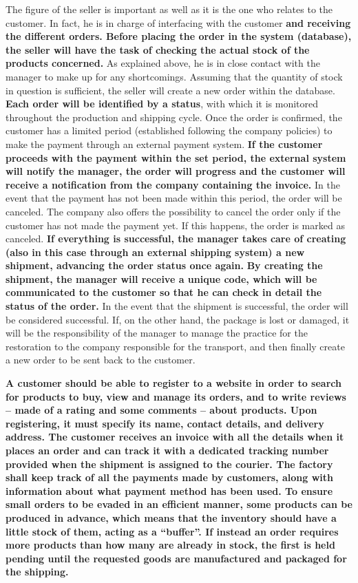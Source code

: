 The figure of the seller is important as well as it is the one who relates to the customer. In fact, he is in charge of interfacing with the customer \textbf{and receiving the different orders. Before placing the order in the system (database), the seller will have the task of checking the actual stock of the products concerned.} As explained above, he is in close contact with the manager to make up for any shortcomings. Assuming that the quantity of stock in question is sufficient, the seller will create a new order within the database. \textbf{Each order will be identified by a status}, with which it is monitored throughout the production and shipping cycle. Once the order is confirmed, the customer has a limited period (established following the company policies) to make the payment through an external payment system. \textbf{If the customer proceeds with the payment within the set period, the external system will notify the manager, the order will progress and the customer will receive a notification from the company containing the invoice.} In the event that the payment has not been made within this period, the order will be canceled. The company also offers the possibility to cancel the order only if the customer has not made the payment yet. If this happens, the order is marked as canceled. \textbf{If everything is successful, the manager takes care of creating (also in this case through an external shipping system) a new shipment, advancing the order status once again.} \textbf{By creating the shipment, the manager will receive a unique code, which will be communicated to the customer so that he can check in detail the status of the order.} In the event that the shipment is successful, the order will be considered successful. If, on the other hand, the package is lost or damaged, it will be the responsibility of the manager to manage the practice for the restoration to the company responsible for the transport, and then finally create a new order to be sent back to the customer.

\textbf{A customer should be able to register to a website in order to search for products to buy, view and manage its orders, and to write reviews -- made of a rating and some comments -- about products. Upon registering, it must specify its name, contact details, and delivery address. The customer receives an invoice with all the details when it places an order and can track it with a dedicated tracking number provided when the shipment is assigned to the courier. The factory shall keep track of all the payments made by customers, along with information about what payment method has been used. To ensure small orders to be evaded in an efficient manner, some products can be produced in advance, which means that the inventory should have a little stock of them, acting as a ``buffer''. If instead an order requires more products than how many are already in stock, the first is held pending until the requested goods are manufactured and packaged for the shipping.}

